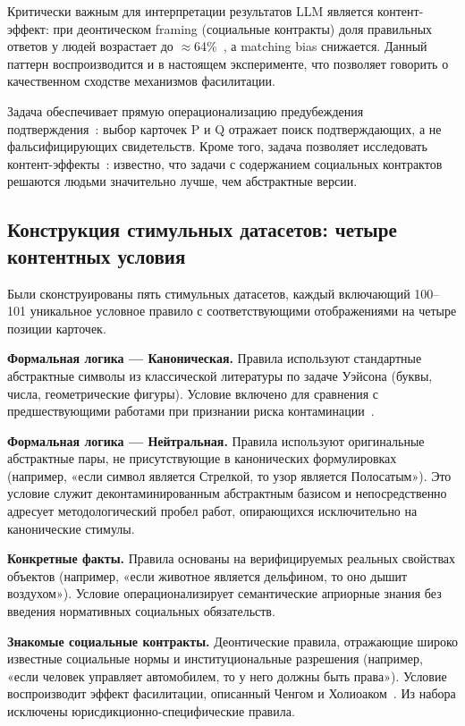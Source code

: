 Критически важным для интерпретации результатов LLM является контент-эффект: при деонтическом framing (социальные контракты) доля правильных ответов у людей возрастает до $\approx$64\%~\cite{ragni2018experimental}, а matching bias снижается. Данный паттерн воспроизводится и в настоящем эксперименте, что позволяет говорить о качественном сходстве механизмов фасилитации.

Задача обеспечивает прямую операционализацию предубеждения подтверждения~\cite{nickerson1998confirmation}: выбор карточек P и Q отражает поиск подтверждающих, а не фальсифицирующих свидетельств. Кроме того, задача позволяет исследовать контент-эффекты~\cite{cheng1985pragmatic, cosmides1992cognitive}: известно, что задачи с содержанием социальных контрактов решаются людьми значительно лучше, чем абстрактные версии.

\subsection{Конструкция стимульных датасетов: четыре контентных условия}

Были сконструированы пять стимульных датасетов, каждый включающий 100--101 уникальное условное правило с соответствующими отображениями на четыре позиции карточек.

\textbf{Формальная логика --- Каноническая.} Правила используют стандартные абстрактные символы из классической литературы по задаче Уэйсона (буквы, числа, геометрические фигуры). Условие включено для сравнения с предшествующими работами при признании риска контаминации~\cite{arkoudas2023gpt4}.

\textbf{Формальная логика --- Нейтральная.} Правила используют оригинальные абстрактные пары, не присутствующие в канонических формулировках (например, «если символ является Стрелкой, то узор является Полосатым»). Это условие служит деконтаминированным абстрактным базисом и непосредственно адресует методологический пробел работ, опирающихся исключительно на канонические стимулы.

\textbf{Конкретные факты.} Правила основаны на верифицируемых реальных свойствах объектов (например, «если животное является дельфином, то оно дышит воздухом»). Условие операционализирует семантические априорные знания без введения нормативных социальных обязательств.

\textbf{Знакомые социальные контракты.} Деонтические правила, отражающие широко известные социальные нормы и институциональные разрешения (например, «если человек управляет автомобилем, то у него должны быть права»). Условие воспроизводит эффект фасилитации, описанный Ченгом и Холиоаком~\cite{cheng1985pragmatic}. Из набора исключены юрисдикционно-специфические правила.

